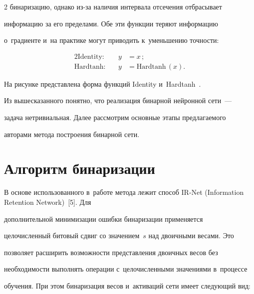 \begin{multicols}{2}
бинаризацию, однако из-за наличия интервала отсечения от\-бра\-сы\-ва\-ет 


информацию за его пределами. Обе эти функции теряют информацию 


о~градиенте и~на прак\-ти\-ке могут приводить к~уменьшению точ\-ности: 


  \begin{alignat*}{2}


  \mbox{Identity}:&\ &y&=x\,;\\[6pt]


  \mbox{Hardtanh}:&\ &y&=\mathrm{Hardtanh}\,(x).


  \end{alignat*}


  


  На рисунке пред\-став\-ле\-на форма функций Identity и~Hardtanh~\cite{5-mal}.


    


  


  Из вышесказанного понятно, что реализация бинарной нейронной сети~--- 


задача не\-три\-ви\-аль\-ная. Далее рас\-смот\-рим основные этапы пред\-ла\-га\-емо\-го 


авторами метода по\-стро\-ения бинарной \mbox{сети}. 


  


\section{Алгоритм бинаризации}





  В основе использованного в~работе метода лежит способ IR-Net (Information Retention Network)~[5]. Для 


дополнительной минимизации ошиб\-ки бинаризации применяется 


це\-ло\-чис\-лен\-ный битовый сдвиг со значением~$s$ над двоичными весами. Это 


поз\-во\-ля\-ет расширить возможности пред\-став\-ле\-ния двоичных весов без 


не\-об\-хо\-ди\-мости выполнять операции с~це\-ло\-чис\-лен\-ны\-ми значениями в~процессе 


обуче\-ния. При этом бинаризация весов и~активаций сети имеет сле\-ду\-ющий вид:






\end{multicols}
